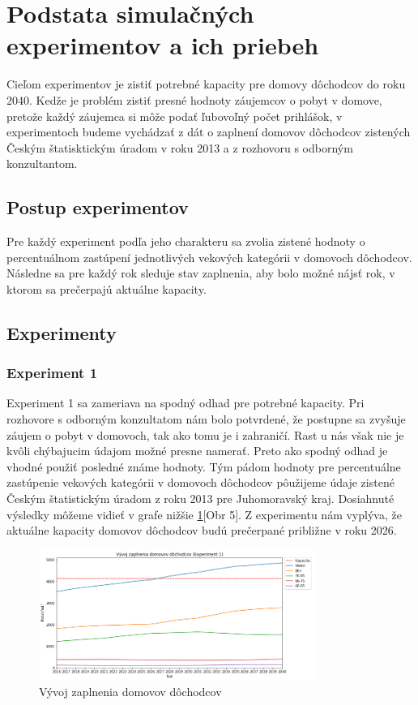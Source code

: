 \documentclass[a4paper, 11pt]{article}
\begin{document}
\section{Podstata simulačných experimentov a ich priebeh}
Cieľom experimentov je zistiť potrebné kapacity pre domovy dôchodcov do roku 2040. Kedže je problém zistiť presné hodnoty záujemcov o pobyt v domove, pretože každý záujemca si môže podať ľubovoľný počet prihlášok, v experimentoch budeme vychádzať z dát o zaplnení domovov dôchodcov zistených Českým štatisktickým úradom v roku 2013 \cite{domovy2013} a z rozhovoru s odborným konzultantom.
\subsection{Postup experimentov}
Pre každý experiment podľa jeho charakteru sa zvolia zistené hodnoty o percentuálnom zastúpení jednotlivých vekových kategórii v domovoch dôchodcov. Následne sa pre každý rok sleduje stav zaplnenia, aby bolo možné nájsť rok, v ktorom sa prečerpajú aktuálne kapacity.
\subsection{Experimenty}
\subsubsection{Experiment 1}
Experiment 1 sa zameriava na spodný odhad pre potrebné kapacity. Pri rozhovore s odborným konzultatom nám bolo potvrdené, že postupne sa zvyšuje záujem o pobyt v domovoch, tak ako tomu je i zahraničí. Rast u nás však nie je kvôli chýbajucim údajom možné presne namerať. Preto ako spodný odhad je vhodné použiť posledné známe hodnoty. Tým pádom hodnoty pre percentuálne zastúpenie vekových kategórii v domovoch dôchodcov pôužijeme údaje zistené Českým štatistickým úradom z roku 2013 \cite{domovy2013} pre Juhomoravský kraj. Dosiahnuté výsledky môžeme vidieť v grafe nižšie \ref{exp_4}[Obr 5]. Z experimentu nám vyplýva, že aktuálne kapacity domovov dôchodcov budú prečerpané približne v roku 2026. 
\begin{figure}[H]
\centering
\includegraphics[width=0.8\textwidth]{exp_4}
\caption{Vývoj zaplnenia domovov dôchodcov\label{exp_4}}
\end{figure}
\end{document}
